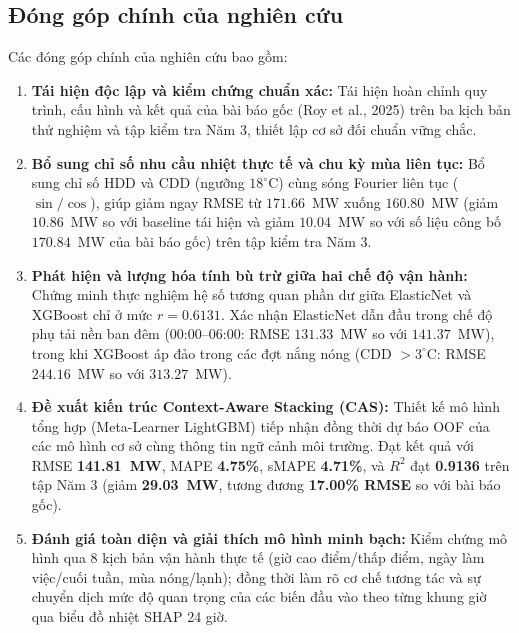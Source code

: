 \subsection{Đóng góp chính của nghiên cứu}
Các đóng góp chính của nghiên cứu bao gồm:
\begin{enumerate}
    \item \textbf{Tái hiện độc lập và kiểm chứng chuẩn xác:} Tái hiện hoàn chỉnh quy trình, cấu hình và kết quả của bài báo gốc (Roy et al., 2025) trên ba kịch bản thử nghiệm và tập kiểm tra Năm 3, thiết lập cơ sở đối chuẩn vững chắc.
    \item \textbf{Bổ sung chỉ số nhu cầu nhiệt thực tế và chu kỳ mùa liên tục:} Bổ sung chỉ số HDD và CDD (ngưỡng $18^\circ\text{C}$) cùng sóng Fourier liên tục ($\sin/\cos$), giúp giảm ngay RMSE từ $171.66$~MW xuống $160.80$~MW (giảm $10.86$~MW so với baseline tái hiện và giảm $10.04$~MW so với số liệu công bố $170.84$~MW của bài báo gốc) trên tập kiểm tra Năm 3.
    \item \textbf{Phát hiện và lượng hóa tính bù trừ giữa hai chế độ vận hành:} Chứng minh thực nghiệm hệ số tương quan phần dư giữa ElasticNet và XGBoost chỉ ở mức $r = 0.6131$. Xác nhận ElasticNet dẫn đầu trong chế độ phụ tải nền ban đêm (00:00--06:00: RMSE $131.33$~MW so với $141.37$~MW), trong khi XGBoost áp đảo trong các đợt nắng nóng (CDD $> 3^\circ\text{C}$: RMSE $244.16$~MW so với $313.27$~MW).
    \item \textbf{Đề xuất kiến trúc Context-Aware Stacking (CAS):} Thiết kế mô hình tổng hợp (Meta-Learner LightGBM) tiếp nhận đồng thời dự báo OOF của các mô hình cơ sở cùng thông tin ngữ cảnh môi trường. Đạt kết quả với RMSE \textbf{141.81~MW}, MAPE \textbf{4.75\%}, sMAPE \textbf{4.71\%}, và $R^2$ đạt \textbf{0.9136} trên tập Năm 3 (giảm \textbf{29.03~MW}, tương đương \textbf{17.00\% RMSE} so với bài báo gốc).
    \item \textbf{Đánh giá toàn diện và giải thích mô hình minh bạch:} Kiểm chứng mô hình qua 8 kịch bản vận hành thực tế (giờ cao điểm/thấp điểm, ngày làm việc/cuối tuần, mùa nóng/lạnh); đồng thời làm rõ cơ chế tương tác và sự chuyển dịch mức độ quan trọng của các biến đầu vào theo từng khung giờ qua biểu đồ nhiệt SHAP 24 giờ.
\end{enumerate}